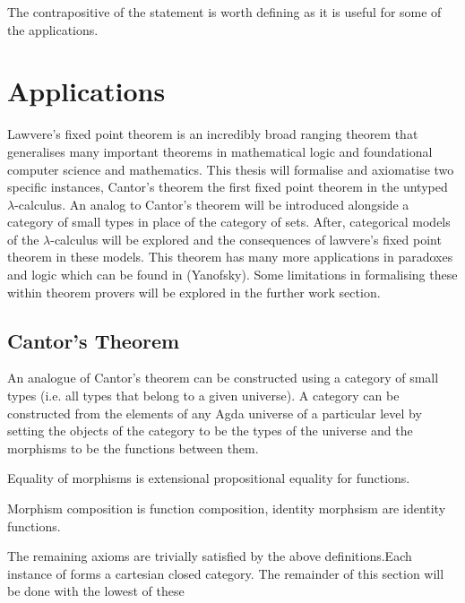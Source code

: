 The contrapositive of the statement is worth defining as it is useful for some
of the applications.

\section{Applications}

Lawvere's fixed point theorem is an incredibly broad ranging theorem that
generalises many important theorems in mathematical logic and foundational
computer science and mathematics. This thesis will formalise and axiomatise two
specific instances, Cantor's theorem the first fixed point theorem
in the untyped $\lambda$-calculus. An analog to Cantor's theorem will be introduced
alongside a category of small types in place of the category of sets.
After, categorical models of the $\lambda$-calculus will be explored and the
consequences of lawvere's fixed point theorem in these models. This theorem has
many more applications in paradoxes and logic which can be found in (Yanofsky).
Some limitations in formalising these within theorem provers will be explored in
the further work section.

\subsection{Cantor's Theorem}
\label{section:cantor}
An analogue of Cantor's theorem can be constructed using a category of small
types (i.e. all types that belong to a given universe). A category can be
constructed from the elements of any Agda universe of a particular level by
setting the objects of the category to be the types of the universe and the
morphisms to be the functions between them.


 Equality of morphisms is extensional propositional equality for functions.


Morphism composition is function composition, identity morphsism are identity
functions.


The remaining axioms are trivially satisfied by the above definitions.Each
instance of  forms a cartesian closed category. The remainder
of this section will be done with the lowest of these

